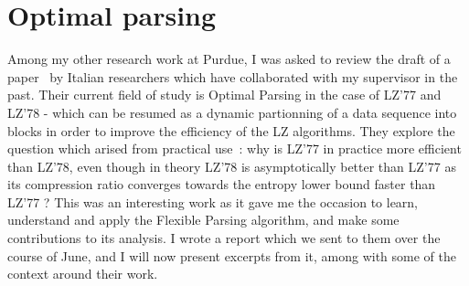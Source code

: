 \section{Optimal parsing}

Among my other research work at Purdue, I was asked to review the draft
of a paper~\cite{langiu_speed_2018} by Italian researchers which have collaborated 
with my supervisor in the past. Their current field of study is Optimal Parsing in the case of 
LZ'77 and LZ'78 - which can be resumed as a dynamic partionning of a data 
sequence into blocks in order to improve the efficiency of the LZ algorithms.
They explore the question which arised from practical use~\cite{mahoney_large_nodate}:
why is LZ'77 in practice more efficient than LZ'78, even though in theory LZ'78 is 
asymptotically better than LZ'77 as its compression ratio converges towards
the entropy lower bound faster than LZ'77 ?
This was an interesting work
as it gave me the occasion to learn, understand and apply the Flexible Parsing 
algorithm, and make some contributions to its analysis.
I wrote a report which we sent to them over the course of June, and I will now present
excerpts from it, among with some of the context around their work.







\renewcommand{\subsection}{\subsubsection}
\renewcommand{\section}{\oldsubsection}

